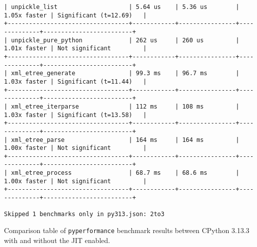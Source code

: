 \begin{code}
\begin{verbatim}
| unpickle_list                    | 5.64 us    | 5.36 us        | 1.05x faster | Significant (t=12.69)   |
+----------------------------------+------------+----------------+--------------+-------------------------+
| unpickle_pure_python             | 262 us     | 260 us         | 1.01x faster | Not significant         |
+----------------------------------+------------+----------------+--------------+-------------------------+
| xml_etree_generate               | 99.3 ms    | 96.7 ms        | 1.03x faster | Significant (t=11.44)   |
+----------------------------------+------------+----------------+--------------+-------------------------+
| xml_etree_iterparse              | 112 ms     | 108 ms         | 1.03x faster | Significant (t=13.58)   |
+----------------------------------+------------+----------------+--------------+-------------------------+
| xml_etree_parse                  | 164 ms     | 164 ms         | 1.00x faster | Not significant         |
+----------------------------------+------------+----------------+--------------+-------------------------+
| xml_etree_process                | 68.7 ms    | 68.6 ms        | 1.00x faster | Not significant         |
+----------------------------------+------------+----------------+--------------+-------------------------+

Skipped 1 benchmarks only in py313.json: 2to3
    \end{verbatim}
    \caption{Comparison table of \texttt{pyperformance} benchmark results between CPython 3.13.3 with and without the JIT enabled.}
    \label{listing:pyperformance-results-313-313-jit}
\end{code}
